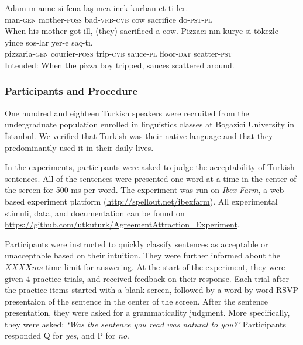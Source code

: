 \documentclass[doc]{apa6}
\begin{document}
\begin{exe}
\ex
\begin{xlist}
\ex \label{fillera}
\gll Adam-ın anne-si fena-la\c{s}-ınca inek kurban et-ti-ler.\\
man-\textsc{gen} mother-\textsc{poss} bad-\textsc{vrb}-\textsc{cvb} cow sacrifice do-\textsc{pst}-\textsc{pl}\\
\glt When his mother got ill, (they) sacrificed a cow.
\ex \label{fillerb}
\gll *Pizzacı-nın kurye-si tökezle-yince sos-lar yer-e saç-tı.\\
pizzaria-\textsc{gen} courier-\textsc{poss} trip-\textsc{cvb} sauce-\textsc{pl} floor-\textsc{dat} scatter-\textsc{pst}\\
\glt Intended: When the pizza boy tripped, sauces scattered around. 
\end{xlist}
\end{exe}

\hypertarget{participants-and-procedure}{%
\subsubsection{Participants and Procedure}\label{participants-and-procedure}}

One hundred and eighteen Turkish speakers were recruited from the undergraduate population enrolled in linguistics classes at Bogazici University in İstanbul. We verified that Turkish was their native language and that they predominantly used it in their daily lives.

In the experiments, participants were asked to judge the acceptability of Turkish sentences. All of the sentences were presented one word at a time in the center of the screen for 500 ms per word.
The experiment was run on \emph{Ibex Farm}, a web-based experiment platform (\url{http://spellout.net/ibexfarm}). All experimental stimuli, data, and documentation can be found on \url{https://github.com/utkuturk/AgreementAttraction_Experiment}.

Participants were instructed to quickly classify sentences as acceptable or unacceptable based on their intuition. They were further informed about the \(XXXX ms\) time limit for answering. At the start of the experiment, they were given 4 practice trials, and received feedback on their response. Each trial after the practice items started with a blank screen, followed by a word-by-word RSVP presentaion of the sentence in the center of the screen. After the sentence presentation, they were asked for a grammaticality judgment. More specifically, they were asked:
\emph{`Was the sentence you read was natural to you?'}
Participants responded Q for \emph{yes}, and P for \emph{no}.
\end{document}
